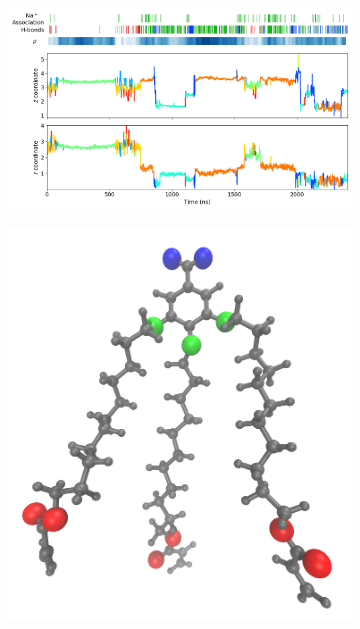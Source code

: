 \documentclass[journal=jpcbfk,manuscript=article]{achemso}
\begin{document}
  \begin{figure}
  \centering
  \begin{subfigure}{0.75\textwidth}
  \includegraphics[width=\textwidth]{mechanism_map.png}
  \caption{}
  \end{subfigure}
  \begin{subfigure}{0.24\textwidth}
  \includegraphics[width=\textwidth]{monomer_oxygens.png}
  \caption{}
  \end{subfigure}

\end{figure}
\end{document}
